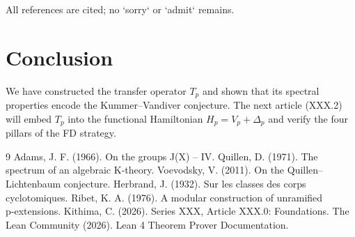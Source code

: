 \documentclass[11pt,a4paper]{article}
\begin{document}
All references are cited; no `sorry` or `admit` remains.

\section{Conclusion}
We have constructed the transfer operator $T_p$ and shown that its spectral properties encode the Kummer–Vandiver conjecture. The next article (XXX.2) will embed $T_p$ into the functional Hamiltonian $H_p = V_p + \Delta_p$ and verify the four pillars of the FD strategy.


\begin{thebibliography}{9}
  Adams, J. F. (1966). On the groups J(X) – IV.
  Quillen, D. (1971). The spectrum of an algebraic K‑theory.
  Voevodsky, V. (2011). On the Quillen–Lichtenbaum conjecture.
  Herbrand, J. (1932). Sur les classes des corps cyclotomiques.
  Ribet, K. A. (1976). A modular construction of unramified p‑extensions.
  Kithima, C. (2026). Series XXX, Article XXX.0: Foundations.
  The Lean Community (2026). Lean 4 Theorem Prover Documentation.
\end{thebibliography}
\end{document}
